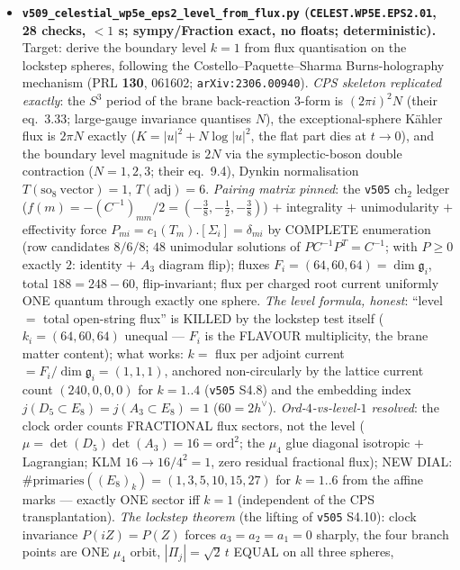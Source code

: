 \begin{itemize}[leftmargin=1.5em]
\item \textbf{\texttt{v509\_celestial\_wp5e\_eps2\_level\_from\_flux.py} (\texttt{CELEST.WP5E.EPS2.01},
28 checks, $<1$ s; sympy/Fraction exact, no floats; deterministic).} Target: derive the boundary
level $k=1$ from flux quantisation on the lockstep spheres, following the
Costello--Paquette--Sharma Burns-holography mechanism (PRL \textbf{130}, 061602;
\texttt{arXiv:2306.00940}). \emph{CPS skeleton replicated exactly}: the $S^3$ period of the brane
back-reaction $3$-form is $(2\pi i)^2N$ (their eq.~3.33; large-gauge invariance quantises $N$),
the exceptional-sphere K\"ahler flux is $2\pi N$ exactly ($K=|u|^2{+}N\log|u|^2$, the flat part
dies at $t\to0$), and the boundary level magnitude is $2N$ via the symplectic-boson double
contraction ($N=1,2,3$; their eq.~9.4), Dynkin normalisation $T(\text{so}_8\ \text{vector})=1$,
$T(\text{adj})=6$. \emph{Pairing matrix pinned}: the \texttt{v505} $\mathrm{ch}_2$ ledger
($f(m)=-(C^{-1})_{mm}/2=(-\tfrac38,-\tfrac12,-\tfrac38)$) $+$ integrality $+$ unimodularity $+$
effectivity force $P_{mi}=c_1(T_m).[\Sigma_i]=\delta_{mi}$ by COMPLETE enumeration (row candidates
$8/6/8$; $48$ unimodular solutions of $PC^{-1}P^T=C^{-1}$; with $P\ge0$ exactly $2$: identity $+$
$A_3$ diagram flip); fluxes $F_i=(64,60,64)=\dim\mathfrak g_i$, total $188=248-60$,
flip-invariant; flux per charged root current uniformly ONE quantum through exactly one sphere.
\emph{The level formula, honest}: ``level $=$ total open-string flux'' is KILLED by the lockstep
test itself ($k_i=(64,60,64)$ unequal --- $F_i$ is the FLAVOUR multiplicity, the brane matter
content); what works: $k=$ flux per adjoint current $=F_i/\dim\mathfrak g_i=(1,1,1)$, anchored
non-circularly by the lattice current count $(240,0,0,0)$ for $k=1..4$ (\texttt{v505} S4.8) and
the embedding index $j(D_5{\subset}E_8)=j(A_3{\subset}E_8)=1$ ($60=2h^\vee$).
\emph{Ord-$4$-vs-level-$1$ resolved}: the clock order counts FRACTIONAL flux sectors, not the
level ($\mu=\det(D_5)\det(A_3)=16=\mathrm{ord}^2$; the $\mu_4$ glue diagonal isotropic $+$
Lagrangian; KLM $16\to16/4^2=1$, zero residual fractional flux); NEW DIAL:
$\#\mathrm{primaries}((E_8)_k)=(1,3,5,10,15,27)$ for $k=1..6$ from the affine marks --- exactly
ONE sector iff $k=1$ (independent of the CPS transplantation). \emph{The lockstep theorem} (the
lifting of \texttt{v505} S4.10): clock invariance $P(iZ)=P(Z)$ forces $a_3=a_2=a_1=0$ sharply,
the four branch points are ONE $\mu_4$ orbit, $|\Pi_j|=\sqrt2\,t$ EQUAL on all three spheres,

\end{itemize}
